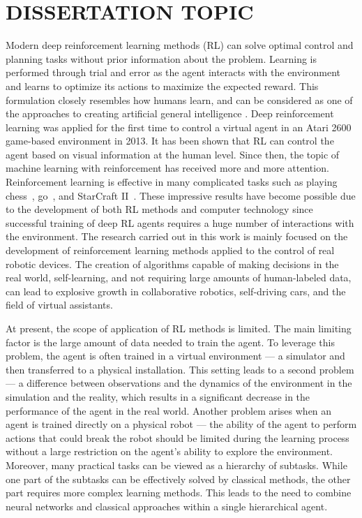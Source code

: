 \section*{\centering DISSERTATION TOPIC}

\renewcommand{\figurename}{Figure}
\renewcommand{\tablename}{Table}
\renewcommand{\bibtitlefull}{References}

Modern deep reinforcement learning methods (RL) can solve optimal control and planning tasks without prior information about the problem. Learning is performed through trial and error as the agent interacts with the environment and learns to optimize its actions to maximize the expected reward. This formulation closely resembles how humans learn, and can be considered as one of the approaches to creating artificial general intelligence \cite{reward_is_enough}. Deep reinforcement learning was applied for the first time to control a virtual agent in an Atari 2600 game-based environment in 2013\cite{mnih2013atari}. It has been shown that RL can control the agent based on visual information at the human level. Since then, the topic of machine learning with reinforcement has received more and more attention. Reinforcement learning is effective in many complicated tasks such as playing chess~\cite{alphazero}, go~\cite{alphago}, and StarCraft II~\cite{alphastar}. These impressive results have become possible due to the development of both RL methods and computer technology since successful training of deep RL agents requires a huge number of interactions with the environment. The research carried out in this work is mainly focused on the development of reinforcement learning methods applied to the control of real robotic devices. The creation of algorithms capable of making decisions in the real world, self-learning, and not requiring large amounts of human-labeled data, can lead to explosive growth in collaborative robotics, self-driving cars, and the field of virtual assistants.

At present, the scope of application of RL methods is limited. The main limiting factor is the large amount of data needed to train the agent. To leverage this problem, the agent is often trained in a virtual environment --- a simulator and then transferred to a physical installation. This setting leads to a second problem --- a difference between observations and the dynamics of the environment in the simulation and the reality, which results in a significant decrease in the performance of the agent in the real world. Another problem arises when an agent is trained directly on a physical robot --- the ability of the agent to perform actions that could break the robot should be limited during the learning process without a large restriction on the agent's ability to explore the environment. Moreover, many practical tasks can be viewed as a hierarchy of subtasks. While one part of the subtasks can be effectively solved by classical methods, the other part requires more complex learning methods. This leads to the need to combine neural networks and classical approaches within a single hierarchical agent.

